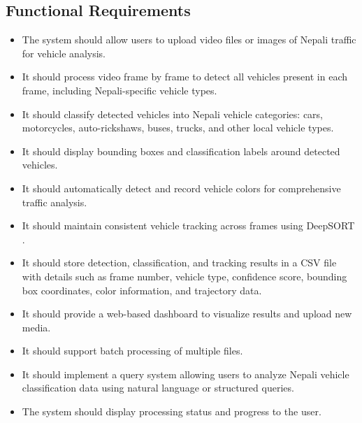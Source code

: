 \documentclass[12pt,a4paper]{report}
\begin{document}
\subsection{Functional Requirements}
\begin{itemize}
    \item The system should allow users to upload video files or images of Nepali traffic for vehicle analysis.
    \item It should process video frame by frame to detect all vehicles present in each frame, including Nepali-specific vehicle types.
    \item It should classify detected vehicles into Nepali vehicle categories: cars, motorcycles, auto-rickshaws, buses, trucks, and other local vehicle types.
    \item It should display bounding boxes and classification labels around detected vehicles.
    \item It should automatically detect and record vehicle colors for comprehensive traffic analysis.
    \item It should maintain consistent vehicle tracking across frames using DeepSORT \cite{bewley2016deepsort}.
    \item It should store detection, classification, and tracking results in a CSV file with details such as frame number, vehicle type, confidence score, bounding box coordinates, color information, and trajectory data.
    \item It should provide a web-based dashboard to visualize results and upload new media.
    \item It should support batch processing of multiple files.
    \item It should implement a query system allowing users to analyze Nepali vehicle classification data using natural language or structured queries.
    \item The system should display processing status and progress to the user.
\end{itemize}
\end{document}
